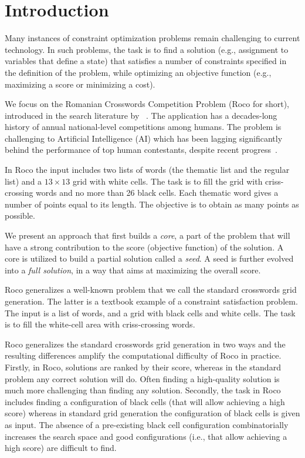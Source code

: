 \section{Introduction}
\label{sec::intro}

Many instances of constraint optimization problems
remain challenging to current technology.
In such problems, the task is to find a solution
(e.g., assignment to variables that define a state) 
that satisfies a number of constraints specified in the definition
of the problem, while optimizing an objective function
(e.g., maximizing a score or minimizing a cost).

We focus on the Romanian Crosswords Competition Problem ({\sc Roco} for short),
introduced in the search literature by
\citeauthor{DBLP:conf/socs/BoteaB21}~.
The application has a decades-long history of annual national-level competitions among humans.
The problem is challenging to Artificial Intelligence (AI) which has been lagging significantly
behind the performance of top human contestants,
despite recent progress~\cite{DBLP:conf/socs/BoteaB21,DBLP:conf/cig/BulitkoB21,Botea_Bulitko_2022}.

In {\sc Roco} the input includes two lists of words (the thematic list and the regular list)
and a $13 \times 13$ grid with white cells.
The task is to fill the grid with criss-crossing words and no more than 26 black cells.
Each thematic word gives a number of points equal to its length. The objective
is to obtain as many points as possible.

We present an approach that first builds a \emph{core},
a part of the problem that will have a strong contribution
to the score (objective function) of the solution.
A core is utilized to build a partial solution called a {\em seed}.
A seed is further evolved into a {\em full solution}, in a way that aims
at maximizing the overall score.

{\sc Roco} generalizes a well-known problem that we
call the {standard crosswords grid generation}.
The latter is a textbook example of a constraint satisfaction problem.
The input is a list of words, and a grid with black cells and white cells.
The task is to fill the white-cell area with criss-crossing words.

{\sc Roco} generalizes the standard crosswords grid generation in two ways
and the resulting differences amplify the computational difficulty of {\sc Roco} in practice.
Firstly, in {\sc Roco}, solutions are ranked by their score,
whereas in the standard problem any correct solution will do.
Often finding a high-quality solution is much more challenging than finding any solution.
Secondly, the task in {\sc Roco} includes finding a configuration of black cells
(that will allow achieving a high score) whereas in standard grid
generation the configuration of black cells is given as input.
The absence of a pre-existing black cell configuration
combinatorially increases the search space and good configurations
(i.e., that allow achieving a high score) are difficult to find.

